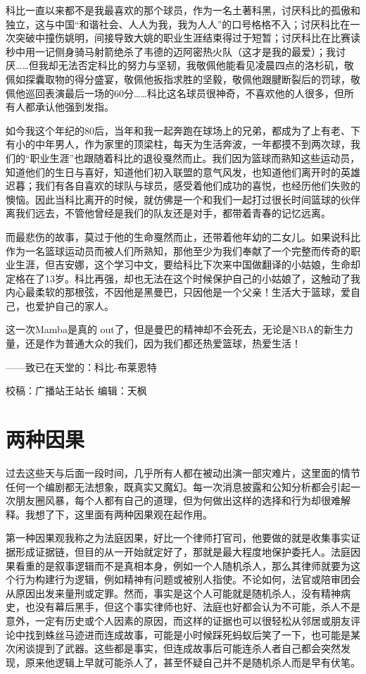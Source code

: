 \documentclass[
]{book}
\begin{document}
科比一直以来都不是我最喜欢的那个球员，作为一名土著科黑，讨厌科比的孤傲和独立，这与中国``和谐社会、人人为我，我为人人''的口号格格不入；讨厌科比在一次突破中撞伤姚明，间接导致大姚的职业生涯结束得过于短暂；讨厌科比在比赛读秒中用一记侧身骑马射箭绝杀了韦德的迈阿密热火队（这才是我的最爱）；我讨厌\ldots\ldots 但我却无法否定科比的努力与坚韧，我敬佩他能看见凌晨四点的洛杉矶，敬佩如探囊取物的得分盛宴，敬佩他扳指求胜的坚毅，敬佩他跟腱断裂后的罚球，敬佩他巡回表演最后一场的60分\ldots\ldots 科比这名球员很神奇，不喜欢他的人很多，但所有人都承认他强到发指。

如今我这个年纪的80后，当年和我一起奔跑在球场上的兄弟，都成为了上有老、下有小的中年男人，作为家里的顶梁柱，每天为生活奔波，一年都摸不到两次球，我们的``职业生涯''也跟随着科比的退役戛然而止。我们因为篮球而熟知这些运动员，知道他们的生日与喜好，知道他们初入联盟的意气风发，也知道他们离开时的英雄迟暮；我们有各自喜欢的球队与球员，感受着他们成功的喜悦，也经历他们失败的懊恼。因此当科比离开的时候，就仿佛是一个和我们一起打过很长时间篮球的伙伴离我们远去，不管他曾经是我们的队友还是对手，都带着青春的记忆远离。

而最悲伤的故事，莫过于他的生命戛然而止，还带着他年幼的二女儿。如果说科比作为一名篮球运动员而被人们所熟知，那他至少为我们奉献了一个完整而传奇的职业生涯，但吉安娜，这个学习中文，要给科比下次来中国做翻译的小姑娘，生命却定格在了13岁。科比再强，却也无法在这个时候保护自己的小姑娘了，这触动了我内心最柔软的那根弦，不因他是黑曼巴，只因他是一个父亲！生活大于篮球，爱自己，也爱护自己的家人。

这一次Mamba是真的 out了，但是曼巴的精神却不会死去，无论是NBA的新生力量，还是作为普通大众的我们，因为我们都还热爱篮球，热爱生活！

------致已在天堂的：科比-布莱恩特

校稿：广播站王站长
编辑：天枫

\hypertarget{ux4e24ux79cdux56e0ux679c}{%
\section{两种因果}\label{ux4e24ux79cdux56e0ux679c}}

过去这些天与后面一段时间，几乎所有人都在被动出演一部灾难片，这里面的情节任何一个编剧都无法想象，既真实又魔幻。每一次消息披露和公知分析都会引起一次朋友圈风暴，每个人都有自己的道理，但为何做出这样的选择和行为却很难解释。我想了下，这里面有两种因果观在起作用。

第一种因果观我称之为法庭因果，好比一个律师打官司，他要做的就是收集事实证据形成证据链，但目的从一开始就定好了，那就是最大程度地保护委托人。法庭因果看重的是叙事逻辑而不是真相本身，例如一个人随机杀人，那么其律师就要为这个行为构建行为逻辑，例如精神有问题或被别人指使。不论如何，法官或陪审团会从原因出发来量刑或定罪。然而，事实是这个人可能就是随机杀人，没有精神病史，也没有幕后黑手，但这个事实律师也好、法庭也好都会认为不可能，杀人不是意外，一定有历史或个人因素的原因，而这样的证据也可以很轻松从邻居或朋友评论中找到蛛丝马迹进而连成故事，可能是小时候踩死蚂蚁后笑了一下，也可能是某次闲谈提到了武器。这些都是事实，但连成故事后可能连杀人者自己都会突然发现，原来他逻辑上早就可能杀人了，甚至怀疑自己并不是随机杀人而是早有伏笔。
\end{document}
